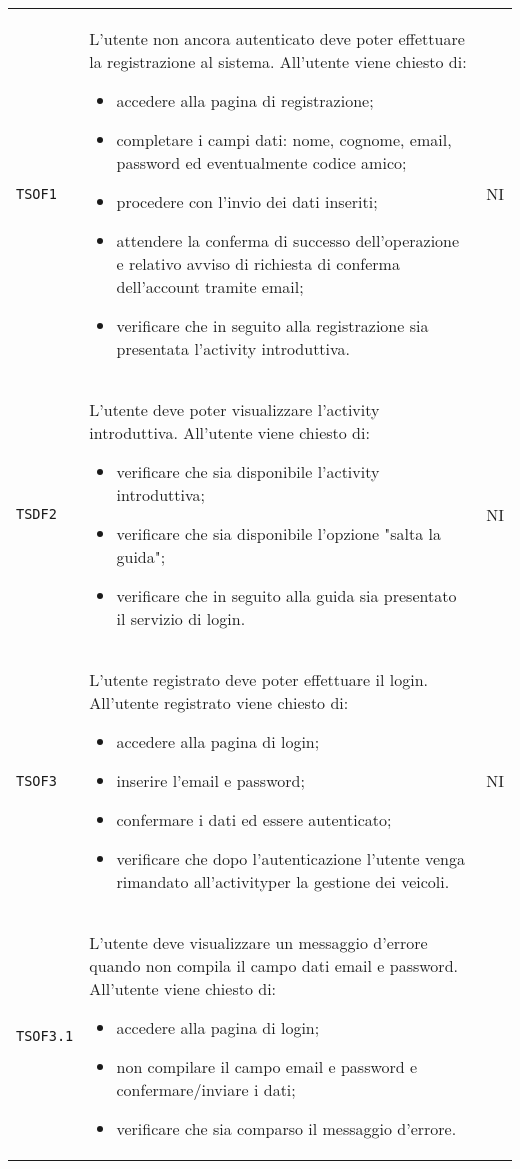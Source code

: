 \begin{longtable}{ >{\centering}p{} >{\centering}p{}
			>{\centering}p{}}
		\texttt{TSOF1}	&	L'utente non ancora autenticato deve poter effettuare la registrazione al sistema. All'utente viene chiesto di:
		\begin{itemize}
			\item accedere alla pagina di registrazione;
			\item completare i campi dati: nome, cognome, email, password ed eventualmente codice amico;
			\item procedere con l'invio dei dati inseriti;
			\item attendere la conferma di successo dell'operazione e relativo avviso di richiesta di conferma dell'account tramite email;
			\item verificare che in seguito alla registrazione sia presentata l'activity introduttiva.
		\end{itemize}	&	NI	\tabularnewline
		 \texttt{TSDF2}	&	L'utente deve poter visualizzare l'activity introduttiva. All'utente viene chiesto di:
		 \begin{itemize}
		 	\item verificare che sia disponibile l'activity introduttiva;
		 	\item verificare che sia disponibile l'opzione "salta la guida";
		 	\item verificare che in seguito alla guida sia presentato il servizio di login. 
		 \end{itemize}	&	NI	\tabularnewline
		 \texttt{TSOF3}	&	L'utente registrato deve poter effettuare il login. All'utente registrato viene chiesto di:
		 \begin{itemize}
		 	\item accedere alla pagina di login;
		 	\item inserire l'email e password;
		 	\item confermare i dati ed essere autenticato;
		 	\item verificare che dopo l'autenticazione l'utente venga rimandato all'activity\glosp per la gestione dei veicoli.
		 \end{itemize}	&	NI	\tabularnewline
		 \texttt{TSOF3.1}	&	L'utente deve visualizzare un messaggio d'errore quando non compila il campo dati email e password. All'utente viene chiesto di:
		 \begin{itemize}
		 	\item accedere alla pagina di login;
		 	\item non compilare il campo email e password e confermare/inviare i dati;
		 	\item verificare che sia comparso il messaggio d'errore.

\end{itemize}
\end{longtable}
